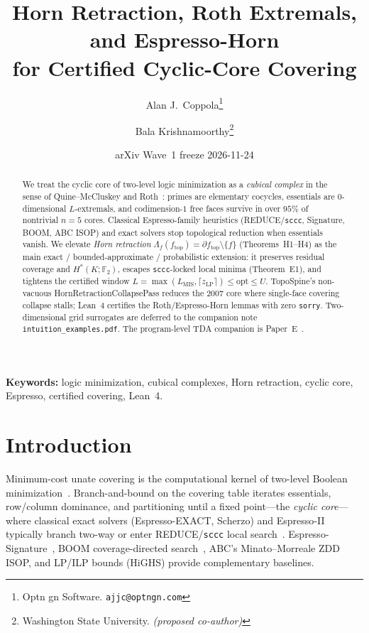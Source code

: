 \documentclass[11pt]{article}
\title{Horn Retraction, Roth Extremals, and Espresso-Horn\\
for Certified Cyclic-Core Covering}
\author{Alan J.\ Coppola\thanks{Optn gn Software. \texttt{ajjc@optngn.com}} \and
Bala Krishnamoorthy\thanks{Washington State University. \textit{(proposed co-author)}}}
\date{arXiv Wave~1 freeze 2026-11-24}
\begin{document}
\maketitle

\begin{abstract}
We treat the cyclic core of two-level logic minimization as a \emph{cubical
complex} in the sense of Quine--McCluskey and Roth~\cite{roth1957}: primes are
elementary cocycles, essentials are $0$-dimensional $L$-extremals, and
codimension-$1$ free faces survive in over $95\%$ of nontrivial $n=5$ cores.
Classical Espresso-family heuristics (\textsf{REDUCE}/\texttt{sccc}, Signature,
BOOM, ABC ISOP) and exact solvers stop topological reduction when essentials
vanish.  We elevate \emph{Horn retraction}
$\Lambda_f(f_{\mathrm{top}})=\partial f_{\mathrm{top}}\setminus\{f\}$
(Theorems~H1--H4) as the main exact / bounded-approximate / probabilistic
extension: it preserves residual coverage and $H^*(K;\mathbb{F}_2)$, escapes
\texttt{sccc}-locked local minima (Theorem~E1), and tightens the certified
window $L=\max(L_{\mathrm{MIS}},\lceil z_{\mathrm{LP}}\rceil)\le\mathrm{opt}\le U$.
\textsf{TopoSpine}'s non-vacuous \textsf{HornRetractionCollapsePass} reduces the
2007 core where single-face covering collapse stalls; Lean~4 certifies the
Roth/Espresso-Horn lemmas with zero \texttt{sorry}.  Two-dimensional grid
surrogates are deferred to the companion note \texttt{intuition\_examples.pdf}.
The program-level TDA companion is Paper~E~\cite{paperE}.
\end{abstract}

\noindent\textbf{Keywords:} logic minimization, cubical complexes, Horn retraction,
cyclic core, Espresso, certified covering, Lean~4.

\section{Introduction}
\label{sec:intro}

Minimum-cost unate covering is the computational kernel of two-level Boolean
minimization~\cite{quine1952,mccluskey1956,coudert1994}.  Branch-and-bound on
the covering table iterates essentials, row/column dominance, and partitioning
until a fixed point---the \emph{cyclic core}---where classical exact solvers
(Espresso-EXACT, Scherzo) and Espresso-II~\cite{brayton1984} typically branch
two-way or enter \textsf{REDUCE}/\texttt{sccc} local search~\cite{goldberg2000}.
Espresso-Signature~\cite{mcgeer1993}, BOOM coverage-directed
search~\cite{fiser2003}, ABC's Minato--Morreale ZDD ISOP, and LP/ILP bounds
(HiGHS) provide complementary baselines.
\end{document}
